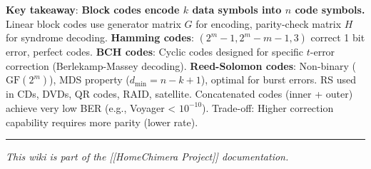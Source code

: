 \textbf{Key takeaway}: \textbf{Block codes encode \(k\) data symbols
into \(n\) code symbols.} Linear block codes use generator matrix \(G\)
for encoding, parity-check matrix \(H\) for syndrome decoding.
\textbf{Hamming codes}: \((2^m-1, 2^m-m-1, 3)\) correct 1 bit error,
perfect codes. \textbf{BCH codes}: Cyclic codes designed for specific
\(t\)-error correction (Berlekamp-Massey decoding). \textbf{Reed-Solomon
codes}: Non-binary (\(\mathrm{GF}(2^m)\)), MDS property
(\(d_{\min} = n-k+1\)), optimal for burst errors. RS used in CDs, DVDs,
QR codes, RAID, satellite. Concatenated codes (inner + outer) achieve
very low BER (e.g., Voyager \textless{} \(10^{-10}\)). Trade-off: Higher
correction capability requires more parity (lower rate).

\begin{center}\rule{0.5\linewidth}{0.5pt}\end{center}

\emph{This wiki is part of the {[}{[}Home\textbar Chimera Project{]}{]}
documentation.}
